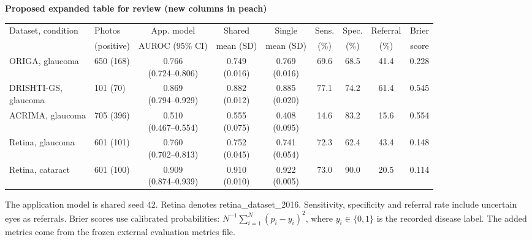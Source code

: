 \documentclass[conference,a4paper]{IEEEtran}
\newcommand{\peachaddition}[1]{%
  \par\smallskip\noindent
  \begingroup\setlength{\fboxsep}{5pt}%
  \colorbox{reviewpeach}{\begin{minipage}{\dimexpr\linewidth-2\fboxsep\relax}
  #1
  \end{minipage}}\endgroup\par\smallskip
}
\begin{document}
\begin{table}[t]
\medskip
\textbf{Proposed expanded table for review (new columns in peach)}
\par\smallskip
{\footnotesize\setlength{\tabcolsep}{3pt}\renewcommand{\arraystretch}{1.35}
\begin{tabular*}{0.94\textwidth}{@{\extracolsep{\fill}}llccc>{\columncolor{reviewpeach}}c>{\columncolor{reviewpeach}}c>{\columncolor{reviewpeach}}c>{\columncolor{reviewpeach}}c@{}}\toprule
Dataset, condition & Photos & App. model & Shared & Single & Sens. & Spec. & Referral & Brier \\[4pt]
& (positive) & AUROC (95\% CI) & mean (SD) & mean (SD) & (\%) & (\%) & (\%) & score \\ \midrule
ORIGA, glaucoma & 650 (168) & \shortstack{0.766\\(0.724--0.806)} & \shortstack{0.749\\(0.016)} & \shortstack{0.769\\(0.016)} & 69.6 & 68.5 & 41.4 & 0.228 \\[4pt]
\shortstack[l]{DRISHTI-GS,\\glaucoma} & 101 (70) & \shortstack{0.869\\(0.794--0.929)} & \shortstack{0.882\\(0.012)} & \shortstack{0.885\\(0.020)} & 77.1 & 74.2 & 61.4 & 0.545 \\[4pt]
ACRIMA, glaucoma & 705 (396) & \shortstack{0.510\\(0.467--0.554)} & \shortstack{0.555\\(0.075)} & \shortstack{0.408\\(0.095)} & 14.6 & 83.2 & 15.6 & 0.554 \\[4pt]
Retina, glaucoma & 601 (101) & \shortstack{0.760\\(0.702--0.813)} & \shortstack{0.752\\(0.045)} & \shortstack{0.741\\(0.054)} & 72.3 & 62.4 & 43.4 & 0.148 \\[4pt]
Retina, cataract & 601 (100) & \shortstack{0.909\\(0.874--0.939)} & \shortstack{0.910\\(0.010)} & \shortstack{0.922\\(0.005)} & 73.0 & 90.0 & 20.5 & 0.114 \\[4pt] \bottomrule
\end{tabular*}}
\peachaddition{\footnotesize
The application model is shared seed 42. Retina denotes retina\_dataset\_2016.
Sensitivity, specificity and referral rate include uncertain eyes as referrals.
Brier scores use calibrated probabilities: $N^{-1}\sum_{i=1}^{N}(p_i-y_i)^2$,
where $y_i\in\{0,1\}$ is the recorded disease label.
The added metrics come from the frozen external evaluation metrics file.
}
\end{table}
\end{document}
